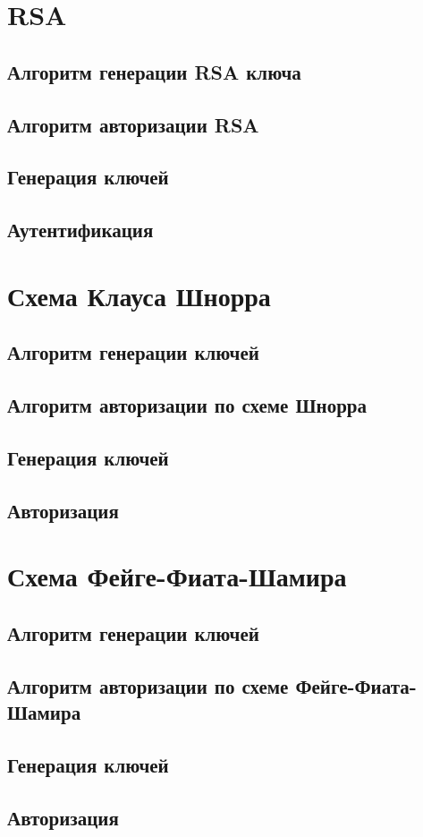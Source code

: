\documentclass{article}
\begin{document}
\section{RSA}
\subsection{Алгоритм генерации RSA ключа}
\subsection{Алгоритм авторизации RSA}
\subsection{Генерация ключей}
\subsection{Аутентификация}

\section{Схема Клауса Шнорра}
\subsection{Алгоритм генерации ключей}
\subsection{Алгоритм авторизации по схеме Шнорра}
\subsection{Генерация ключей}
\subsection{Авторизация}

\section{Схема Фейге-Фиата-Шамира}
\subsection{Алгоритм генерации ключей}
\subsection{Алгоритм авторизации по схеме Фейге-Фиата-Шамира}
\subsection{Генерация ключей}
\subsection{Авторизация}
\end{document}
